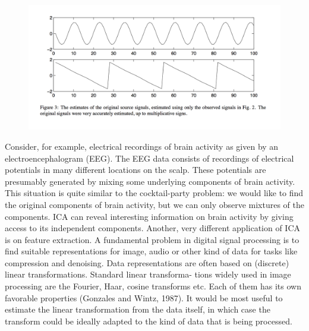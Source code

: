 \documentclass[12pt, a4paper, onecolumn]{IEEEtran}
\begin{document}
\begin{figure}[h]
    \centering
    \includegraphics[width=1\textwidth]{3}
\end{figure}
Consider, for example, electrical recordings of brain activity as given by an electroencephalogram (EEG). The EEG data consists of recordings of electrical potentials in many different locations on the scalp. These potentials are presumably generated by mixing some underlying components of brain activity. This situation is quite similar to the cocktail-party problem: we would like to find the original components of brain activity, but we can only observe mixtures of the components. ICA can reveal interesting information on brain activity by giving access to its independent components.
Another, very different application of ICA is on feature extraction. A fundamental problem in digital signal processing is to find suitable representations for image, audio or other kind of data for tasks like compression and denoising. Data representations are often based on (discrete) linear transformations. Standard linear transforma- tions widely used in image processing are the Fourier, Haar, cosine transforms etc. Each of them has its own favorable properties (Gonzales and Wintz, 1987).
It would be most useful to estimate the linear transformation from the data itself, in which case the transform could be ideally adapted to the kind of data that is being processed.
\end{document}
